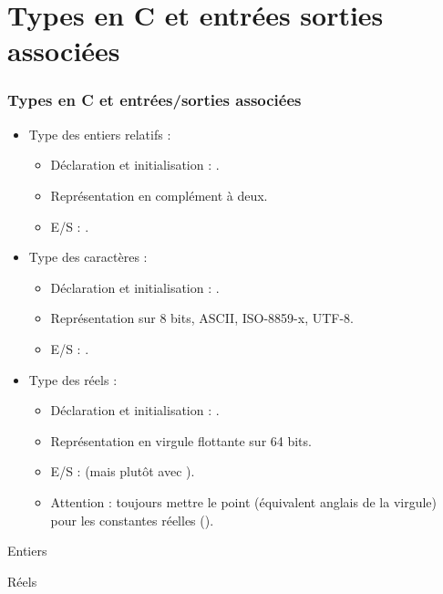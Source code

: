 \documentclass[xcolor=svgnames]{beamer}
\begin{document}
\section[Types et E/S]{Types en C et entrées sorties associées}
\begin{frame}
  \frametitle{Types en C et entrées/sorties associées}
  
\pause
  \begin{itemize}
  \item Type des entiers relatifs  \alert{} : 
    \begin{itemize}
    \item Déclaration et initialisation : .
    \item Représentation en complément à deux.
    \item E/S : \alert{}.
    \end{itemize}
\pause
  \item Type des caractères \alert{} :
    \begin{itemize}
    \item Déclaration et initialisation : .
    \item Représentation sur 8 bits, ASCII, ISO-8859-x, UTF-8.
    \item E/S : \alert{}.
    \end{itemize}
\pause
  \item Type des réels \alert{} :
    \begin{itemize}
    \item Déclaration et initialisation : .
    \item Représentation en virgule flottante sur 64 bits.
    \item E/S : \alert{} (mais plutôt  avec ).
    \item \alert{Attention :} toujours mettre le point (équivalent
      anglais de la virgule) pour les constantes réelles ().
    \end{itemize}
  \end{itemize}
\end{frame}

\begin{frame}
  \begin{block}{Entiers}
  \end{block}\pause

\begin{block}{Réels}
\end{block}

\end{frame}
\end{document}
